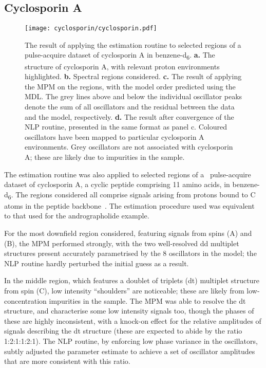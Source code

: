 \subsection{Cyclosporin A}
\label{subsec:cyclo}
\begin{figure}
    \texttt{[image: cyclosporin/cyclosporin.pdf]}
    \caption[
        The result of applying the estimation routine to selected regions of a
        pulse-acquire dataset of cyclosporin A.
    ]{
        The result of applying the estimation routine to selected regions of a
        pulse-acquire dataset of cyclosporin A in benzene-d\textsubscript{6}.
        \textbf{a.} The structure of cyclosporin A, with relevant proton
        environments highlighted.
        \textbf{b.} Spectral regions considered.
        \textbf{c.} The result of applying the \acs{MPM} on the regions, with
        the model order predicted using the \acs{MDL}.
        The grey lines above and below the individual oscillator peaks denote
        the sum of all oscillators and the residual between the data and the
        model, respectively.
        \textbf{d.} The result after convergence of the \acs{NLP} routine,
        presented in the same format as panel c.
        Coloured oscillators have been mapped to particular cyclosporin A
        environments. Grey oscillators are not associated with
        cyclosporin A; these are likely due to impurities in the sample.
    }
    \label{fig:cyclosporin}
\end{figure}
The estimation routine was also applied to selected regions of a
\proton\ pulse-acquire dataset of cyclosporin A,
a cyclic peptide comprising 11 amino
acids, in benzene-d\textsubscript{6}.
The regions considered all comprise
signals arising from protons bound to C\textsuperscript{\textalpha} atoms in
the peptide backbone~\cite{Verma2018}.
The estimation procedure used was equivalent to
that used for the andrographolide example.

For the most downfield region
considered, featuring signals from spins (A) and (B), the \ac{MPM} performed
strongly, with the two well-resolved dd multiplet structures present
accurately parametrised by the 8 oscillators in the model; the \ac{NLP} routine
hardly perturbed the initial guess as a result.

In the middle region, which features a doublet of triplets (dt) multiplet structure
from spin (C), low intensity ``shoulders'' are noticeable;
these are likely from low-concentration impurities in the sample. The \ac{MPM}
was able to resolve the dt structure, and characterise
some low intensity signals too, though the phases of these are highly
inconsistent, with a knock-on effect for the relative amplitudes of signals
describing the dt structure (these are expected to abide by the ratio
1:2:1:1:2:1). The \ac{NLP} routine, by enforcing low phase variance in the
oscillators, subtly adjusted the parameter estimate to achieve a set of
oscillator amplitudes that are more consistent with this ratio.

